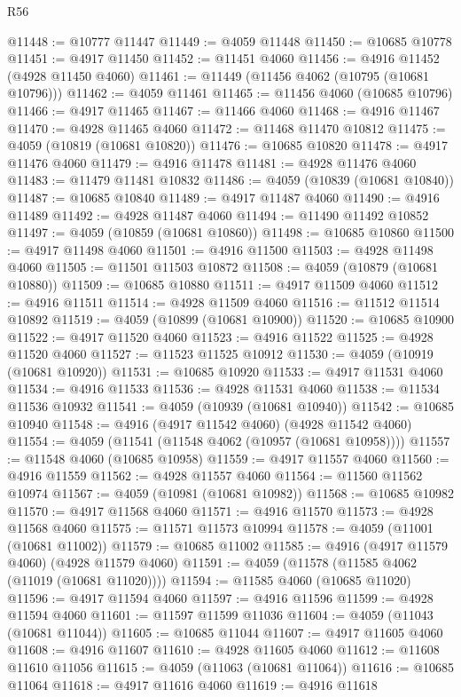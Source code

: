 \begin{lexlean}{R56}
\begin{coremodule}
@11448 := @10777 @11447
@11449 := @4059 @11448
@11450 := @10685 @10778
@11451 := @4917 @11450
@11452 := @11451 @4060
@11456 := @4916 @11452 (@4928 @11450 @4060)
@11461 := @11449 (@11456 @4062 (@10795 (@10681 @10796)))
@11462 := @4059 @11461
@11465 := @11456 @4060 (@10685 @10796)
@11466 := @4917 @11465
@11467 := @11466 @4060
@11468 := @4916 @11467
@11470 := @4928 @11465 @4060
@11472 := @11468 @11470 @10812
@11475 := @4059 (@10819 (@10681 @10820))
@11476 := @10685 @10820
@11478 := @4917 @11476 @4060
@11479 := @4916 @11478
@11481 := @4928 @11476 @4060
@11483 := @11479 @11481 @10832
@11486 := @4059 (@10839 (@10681 @10840))
@11487 := @10685 @10840
@11489 := @4917 @11487 @4060
@11490 := @4916 @11489
@11492 := @4928 @11487 @4060
@11494 := @11490 @11492 @10852
@11497 := @4059 (@10859 (@10681 @10860))
@11498 := @10685 @10860
@11500 := @4917 @11498 @4060
@11501 := @4916 @11500
@11503 := @4928 @11498 @4060
@11505 := @11501 @11503 @10872
@11508 := @4059 (@10879 (@10681 @10880))
@11509 := @10685 @10880
@11511 := @4917 @11509 @4060
@11512 := @4916 @11511
@11514 := @4928 @11509 @4060
@11516 := @11512 @11514 @10892
@11519 := @4059 (@10899 (@10681 @10900))
@11520 := @10685 @10900
@11522 := @4917 @11520 @4060
@11523 := @4916 @11522
@11525 := @4928 @11520 @4060
@11527 := @11523 @11525 @10912
@11530 := @4059 (@10919 (@10681 @10920))
@11531 := @10685 @10920
@11533 := @4917 @11531 @4060
@11534 := @4916 @11533
@11536 := @4928 @11531 @4060
@11538 := @11534 @11536 @10932
@11541 := @4059 (@10939 (@10681 @10940))
@11542 := @10685 @10940
@11548 := @4916 (@4917 @11542 @4060) (@4928 @11542 @4060)
@11554 := @4059 (@11541 (@11548 @4062 (@10957 (@10681 @10958))))
@11557 := @11548 @4060 (@10685 @10958)
@11559 := @4917 @11557 @4060
@11560 := @4916 @11559
@11562 := @4928 @11557 @4060
@11564 := @11560 @11562 @10974
@11567 := @4059 (@10981 (@10681 @10982))
@11568 := @10685 @10982
@11570 := @4917 @11568 @4060
@11571 := @4916 @11570
@11573 := @4928 @11568 @4060
@11575 := @11571 @11573 @10994
@11578 := @4059 (@11001 (@10681 @11002))
@11579 := @10685 @11002
@11585 := @4916 (@4917 @11579 @4060) (@4928 @11579 @4060)
@11591 := @4059 (@11578 (@11585 @4062 (@11019 (@10681 @11020))))
@11594 := @11585 @4060 (@10685 @11020)
@11596 := @4917 @11594 @4060
@11597 := @4916 @11596
@11599 := @4928 @11594 @4060
@11601 := @11597 @11599 @11036
@11604 := @4059 (@11043 (@10681 @11044))
@11605 := @10685 @11044
@11607 := @4917 @11605 @4060
@11608 := @4916 @11607
@11610 := @4928 @11605 @4060
@11612 := @11608 @11610 @11056
@11615 := @4059 (@11063 (@10681 @11064))
@11616 := @10685 @11064
@11618 := @4917 @11616 @4060
@11619 := @4916 @11618

\end{coremodule}
\end{lexlean}
